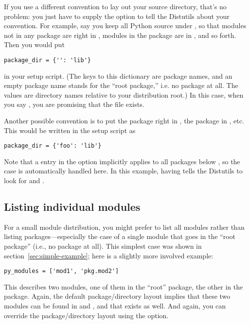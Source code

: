 \documentclass{howto}
\begin{document}
If you use a different convention to lay out your source directory,
that's no problem: you just have to supply the 
option to tell the Distutils about your convention.  For example, say
you keep all Python source under , so that modules not in any
package are right in , modules in the  package
are in , and so forth.  Then you would put
\begin{verbatim}
package_dir = {'': 'lib'}
\end{verbatim}
in your setup script.  (The keys to this dictionary are package names,
and an empty package name stands for the ``root package,'' i.e. no
package at all.  The values are directory names relative to your
distribution root.)  In this case, when you say
, you are promising that the file
 exists.

Another possible convention is to put the  package right in 
, the  package in , etc.  This
would be written in the setup script as
\begin{verbatim}
package_dir = {'foo': 'lib'}
\end{verbatim}
Note that a  entry in the
 option implicitly applies to all packages below
, so the  case is automatically handled
here.  In this example, having 
tells the Distutils to look for  and
.


\subsection{Listing individual modules}
\label{sec:listing-modules}

For a small module distribution, you might prefer to list all modules
rather than listing packages---especially the case of a single module
that goes in the ``root package'' (i.e., no package at all).  This
simplest case was shown in section~\ref{sec:simple-example}; here is a
slightly more involved example:
\begin{verbatim}
py_modules = ['mod1', 'pkg.mod2']
\end{verbatim}
This describes two modules, one of them in the ``root'' package, the
other in the  package.  Again, the default
package/directory layout implies that these two modules can be found in
 and , and that 
exists as well.  And again, you can override the package/directory
layout using the  option.  
\end{document}
